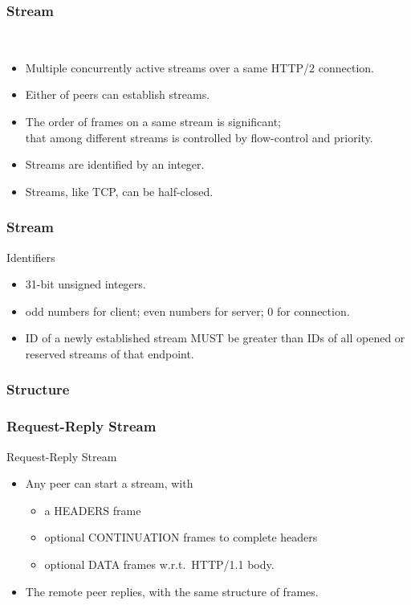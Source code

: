 \documentclass[lualatex]{beamer}
\begin{document}
\begin{frame}
  \frametitle{Stream}

  \begin{block}{~}
    \begin{itemize}
    \item Multiple concurrently active streams over a same HTTP/2 connection.
    \item Either of peers can establish streams.
    \item The order of frames on a same stream is significant;\\
      that among different streams is controlled by flow-control and priority.
    \item Streams are identified by an integer.
    \item Streams, like TCP, can be half-closed.
    \end{itemize}
  \end{block}
\end{frame}

\begin{frame}
  \frametitle{Stream}

  \begin{block}{Identifiers}
    \begin{itemize}
    \item 31-bit unsigned integers.
    \item odd numbers for client; even numbers for server; 0 for connection.
    \item ID of a newly established stream MUST be greater than IDs of all opened or reserved streams of that endpoint.
    \end{itemize}
  \end{block}
\end{frame}

\subsubsection{Structure}

\begin{frame}
  \frametitle{Request-Reply Stream}

  \begin{block}{Request-Reply Stream}
    \begin{itemize}
    \item Any peer can start a stream, with
      \begin{itemize}
      \item a HEADERS frame
      \item optional CONTINUATION frames to complete headers
      \item optional DATA frames w.r.t.\ HTTP/1.1 body.
      \end{itemize}
    \item The remote peer replies, with the same structure of frames. 
    \end{itemize}
  \end{block}
\end{frame}
\end{document}
